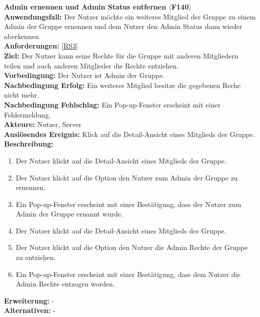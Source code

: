 \documentclass[parskip=full]{scrartcl}
\begin{document}
\textbf{Admin ernennen und Admin Status entfernen $\langle$F140$\rangle$}\\
\textbf{Anwendungsfall:} Der Nutzer möchte ein weiteres Mitglied der Gruppe zu einem Admin der Gruppe ernennen und dem Nutzer den Admin Status dann wieder aberkennen.\\
\textbf{Anforderungen:} \ref{RS3}\\
\textbf{Ziel:} Der Nutzer kann seine Rechte für die Gruppe mit anderen Mitgliedern teilen und auch anderen Mitglieder die Rechte entziehen.\\
\textbf{Vorbedingung:} Der Nutzer ist Admin der Gruppe.\\
\textbf{Nachbedingung Erfolg:} Ein weiteres Mitglied besitze die gegebenen Reche nicht mehr.\\
\textbf{Nachbedingung Fehlschlag:} Ein Pop-up-Fenster erscheint mit einer Fehlermeldung.\\
\textbf{Akteure:} Nutzer, Server \\
\textbf{Auslösendes Ereignis:} Klick auf die Detail-Ansicht eines Mitglieds der Gruppe.\\
\textbf{Beschreibung:}
\begin{enumerate}
    \item Der Nutzer klickt auf die Detail-Ansicht eines Mitglieds der Gruppe.
    \item Der Nutzer klickt auf die Option den Nutzer zum Admin der Gruppe zu ernennen.
    \item Ein Pop-up-Fenster erscheint mit einer Bestätigung, dass der Nutzer zum Admin der Gruppe ernannt wurde.
    \item Der Nutzer klickt auf die Detail-Ansicht eines Mitglieds der Gruppe.
    \item Der Nutzer klickt auf die Option den Nutzer die Admin Rechte der Gruppe zu entziehen.
     \item Ein Pop-up-Fenster erscheint mit einer Bestätigung, dass dem Nutzer die Admin Rechte entzogen worden.
\end{enumerate}
\textbf{Erweiterung:} -\\
\textbf{Alternativen:} -\\
\newpage
\end{document}

